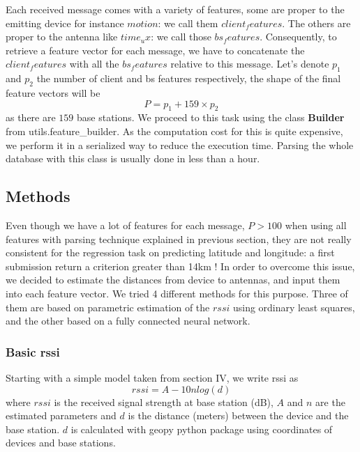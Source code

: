 \documentclass[twocolumn,2pt]{article}
\begin{document}
	Each received message comes with a variety of features, some are proper to the emitting device for instance $motion$: we call them $client_features$. The others are proper to the antenna like $time_ux$: we call those $bs_features$. Consequently, to retrieve a feature vector for each message, we have to concatenate the $client_features$ with all the $bs_features$ relative to this message. Let's denote $p_1$ and $p_2$ the number of client and bs features respectively, the shape of the final feature vectors will be 
	\begin{equation}
		\label{feature_number}
		P= p_1 + 159 \times p_2
	\end{equation}
	 as there are $159$ base stations. We proceed to this task using the class \textbf{Builder} from utils.feature\_builder. As the computation cost for this is quite expensive, we perform it in a serialized way to reduce the execution time. Parsing the whole database with this class is usually done in less than a hour.
	
	
	\subsection{Methods}
	Even though we have a lot of features for each message, $P>100$ when using all features with parsing technique explained in previous section, they are not really consistent for the regression task on predicting latitude and longitude: a first submission return a criterion greater than 14km ! In order to overcome this issue, we decided to estimate the distances from device to antennas, and input them into each feature vector. We tried 4 different methods for this purpose. Three of them are based on parametric estimation of the $rssi$ using ordinary least squares, and the other based on a fully connected neural network.
	
	
	\subsubsection*{Basic rssi}
	Starting with a simple model taken from \cite{srbinovska2011localization} section IV, we write rssi as 
	\begin{equation}
	\label{naive_rssi}
		rssi = A - 10 n log(d) 
	\end{equation}
	where $rssi$ is the received signal strength at base station (dB), $A$ and $n$ are the estimated parameters and $d$ is the distance (meters) between the device and the base station. $d$ is calculated with geopy python package using coordinates of devices and base stations.
	
\end{document}
